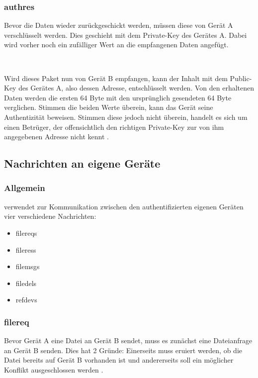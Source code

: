 \subsubsection{\gls{authres}}
Bevor die Daten wieder zurückgeschickt werden, müssen diese von Gerät A verschlüsselt werden. Dies geschieht mit dem Private-Key des Gerätes A. Dabei wird vorher noch ein zufälliger Wert an die empfangenen Daten angefügt.
\messagestart
	 \\
	
	\begin{rightwordgroup}{\isprotomsgtype}
	\end{rightwordgroup} \\
	
	\begin{rightwordgroup}{\isprotomsgdata}
	\end{rightwordgroup}
	
Wird dieses Paket nun von Gerät B empfangen, kann der Inhalt mit dem Public-Key des Gerätes A, also dessen Adresse, entschlüsselt werden. Von den erhaltenen Daten werden die ersten 64 Byte mit den ursprünglich gesendeten 64 Byte verglichen. Stimmen die beiden Werte überein, kann das Gerät seine Authentizität beweisen. Stimmen diese jedoch nicht überein, handelt es sich um einen Betrüger, der offensichtlich den richtigen Private-Key zur von ihm angegebenen Adresse nicht kennt .
		
\subsection{Nachrichten an eigene Geräte}
\subsubsection{Allgemein}
\sblitg verwendet zur Kommunikation zwischen den authentifizierten eigenen Geräten vier verschiedene Nachrichten:
\begin{itemize}
	\item \gls{filereq}s
	\item \gls{fileres}s
	\item \gls{filemsg}s
	\item \gls{filedel}s
	\item \gls{refdev}s
\end{itemize}

\subsubsection{\gls{filereq}} \label{Dateianfrage}
Bevor Gerät A eine Datei an Gerät B sendet, muss es zunächst eine Dateianfrage an Gerät B senden. Dies hat 2 Gründe: Einerseits muss eruiert werden, ob die Datei bereits auf Gerät B vorhanden ist und andererseits soll ein möglicher Konflikt  ausgeschlossen werden .
\messagestart
	 \\
	
